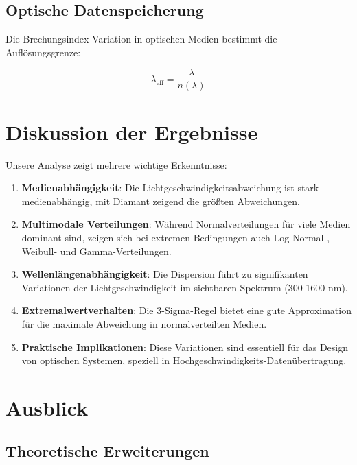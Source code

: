 \documentclass[a4paper,12pt]{article}
\theoremstyle{definition}
\theoremstyle{remark}
\begin{document}
\subsection{Optische Datenspeicherung}

Die Brechungsindex-Variation in optischen Medien bestimmt die Auflösungsgrenze:

\begin{equation}
    \lambda_{\text{eff}} = \frac{\lambda}{n(\lambda)}
\end{equation}

\section{Diskussion der Ergebnisse}

Unsere Analyse zeigt mehrere wichtige Erkenntnisse:

\begin{enumerate}
    \item \textbf{Medienabhängigkeit}: Die Lichtgeschwindigkeitsabweichung ist stark medienabhängig, mit Diamant zeigend die größten Abweichungen.
    
    \item \textbf{Multimodale Verteilungen}: Während Normalverteilungen für viele Medien dominant sind, zeigen sich bei extremen Bedingungen auch Log-Normal-, Weibull- und Gamma-Verteilungen.
    
    \item \textbf{Wellenlängenabhängigkeit}: Die Dispersion führt zu signifikanten Variationen der Lichtgeschwindigkeit im sichtbaren Spektrum (300-1600 nm).
    
    \item \textbf{Extremalwertverhalten}: Die 3-Sigma-Regel bietet eine gute Approximation für die maximale Abweichung in normalverteilten Medien.
    
    \item \textbf{Praktische Implikationen}: Diese Variationen sind essentiell für das Design von optischen Systemen, speziell in Hochgeschwindigkeits-Datenübertragung.
\end{enumerate}

\section{Ausblick}

\subsection{Theoretische Erweiterungen}
\end{document}
